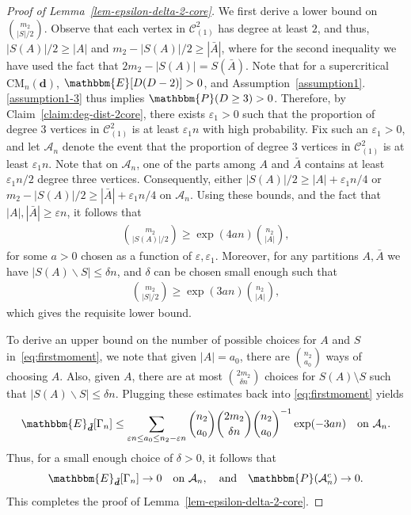 \documentclass[11pt,a4paper, reqno]{article}
\numberwithin{equation}{section}
\numberwithin{equation}{section}
\def\sss{\scriptscriptstyle}
\newcommand{\PR}{\ensuremath{\mathbbm{P}}}
\newcommand{\E}{\ensuremath{\mathbbm{E}}}
\newcommand{\1}{\ensuremath{\mathbbm{1}}}
\newcommand{\CM}{\ensuremath{\mathrm{CM}_n(\boldsymbol{d})}}
\newcommand{\bld}[1]{\boldsymbol{#1}}
\numberwithin{equation}{section}
\numberwithin{theorem}{section}
\begin{document}
\begin{proof}[Proof of Lemma~\ref{lem-epsilon-delta-2-core}]
We first derive a lower bound on $\binom{m_2}{|S|/2}$. 
Observe that each vertex in $\mathscr{C}_{\sss (1)}^2$ has degree at least $2$, and thus, $|S(A)|/2 \geq |A|$ and $m_2 - |S(A)|/2 \geq |\bar{A}|$, where for the second inequality we have used the fact that $2m_2 -|S(A)| = S(\bar{A})$.
 Note that for a supercritical $\CM$, $\E[D(D-2)]>0$, and Assumption~\ref{assumption1}.\ref{assumption1-3} thus implies $\PR(D\geq 3) >0$.
  Therefore, by Claim~\ref{claim:deg-dist-2core}, there exists $\varepsilon_1>0$ such that the proportion of degree 3 vertices in $\mathscr{C}_{\sss (1)}^2$ is at least $\varepsilon_1 n$ with high probability. 
  Fix such an $\varepsilon_1>0$, and 
 let $\mathcal{A}_n$ denote the event that the proportion of degree 3 vertices in $\mathscr{C}_{\sss (1)}^2$ is at least $\varepsilon_1 n$.  
Note that on $\mathcal{A}_n$, one of the parts among $A$ and $\bar{A}$ contains at least $\varepsilon_1n/2$ degree three vertices. Consequently, either $|S(A) |/2 \geq |A| + \varepsilon_1 n / 4$ or $ m_2 - |S(A)|/2 \geq |\bar{A}| + \varepsilon_1 n/4$ on $\mathcal{A}_n$. 
Using these bounds, and the fact that $|A|, |\bar{A}| \geq \varepsilon n$, it follows that 
\begin{align}
\binom{m_2}{|S(A)|/2} \geq \exp(4an) \binom{n_2}{|A|} , \nonumber 
\end{align}
for some $a>0$ chosen as a function of $\varepsilon, \varepsilon_1$. Moreover, for any partitions $A,\bar{A}$ we have $|S(A) \backslash S| \leq \delta n$, and $\delta$ can be chosen small enough such that
\begin{align}
\binom{m_2}{|S|/2 } \geq \exp(3an) \binom{n_2}{|A|}, \nonumber 
\end{align}which gives the requisite lower bound.

To derive an upper bound on the number of possible choices for $A$ and $S$ in~\eqref{eq:firstmoment}, we note that given $|A|=a_0$, there are $\binom{n_2}{a_0}$ ways of choosing $A$. 
Also, given $A$, there are at most $\binom{2 m_2 }{\delta n}$ choices for $S(A)\setminus S$ such that $|S(A)\backslash S| \leq \delta n$.
Plugging these estimates back into \eqref{eq:firstmoment} yields
\begin{align}
\E_{\bld{\tilde{d}}}[\Gamma_n] \leq \sum_{ \varepsilon n \leq a_0 \leq n_2 - \varepsilon n} \binom{n_2}{a_0}  \binom{2m_2}{\delta n} \binom{n_2}{a_0}^{-1} \exp(-3an) \quad \text{on } \mathcal{A}_n. \nonumber 
\end{align}
Thus, for a small enough choice of $\delta>0$, it follows that
\begin{equation*}
 \E_{\bld{\tilde{d}}}[\Gamma_n]\to 0\quad \text{on } \mathcal{A}_n,  \quad\text{and}\quad \PR(\mathcal{A}_n^c) \to 0.
\end{equation*}
This completes the proof of Lemma~\ref{lem-epsilon-delta-2-core}. 
\end{proof} 
%
%
%
%
%
%
\end{document}
